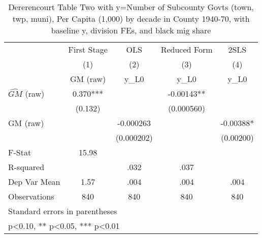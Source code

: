 \begin{table}[htbp]\centering
\def\sym#1{\ifmmode^{#1}\else\(^{#1}\)\fi}
\caption{Dererencourt Table Two with y=Number of Subcounty Govts (town, twp, muni), Per Capita (1,000) by decade in County 1940-70, with baseline y, division FEs, and black mig share}
\begin{tabular}{l*{4}{c}}
\toprule
                    & First Stage   &         OLS   &Reduced Form   &        2SLS   \\
                    &\multicolumn{1}{c}{(1)}&\multicolumn{1}{c}{(2)}&\multicolumn{1}{c}{(3)}&\multicolumn{1}{c}{(4)}\\
                    &\multicolumn{1}{c}{GM  (raw)}&\multicolumn{1}{c}{y\_L0}&\multicolumn{1}{c}{y\_L0}&\multicolumn{1}{c}{y\_L0}\\
\midrule
$\hat{GM}$ (raw)    &       0.370***&               &    -0.00143** &               \\
                    &     (0.132)   &               &  (0.000560)   &               \\
\addlinespace
GM  (raw)           &               &   -0.000263   &               &    -0.00388*  \\
                    &               &  (0.000202)   &               &   (0.00200)   \\
\midrule
F-Stat              &       15.98   &               &               &               \\
R-squared           &               &        .032   &        .037   &               \\
Dep Var Mean        &        1.57   &        .004   &        .004   &        .004   \\
Observations        &         840   &         840   &         840   &         840   \\
\bottomrule
\multicolumn{5}{l}{\footnotesize Standard errors in parentheses}\\
\multicolumn{5}{l}{\footnotesize * p<0.10, ** p<0.05, *** p<0.01}\\
\end{tabular}
\end{table}
